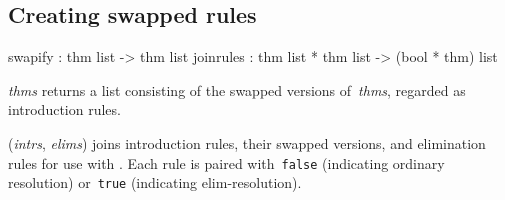 \subsection{Creating swapped rules}
\begin{ttbox} 
swapify   : thm list -> thm list
joinrules : thm list * thm list -> (bool * thm) list
\end{ttbox}
\begin{ttdescription}
\item[\ttindexbold{swapify} {\it thms}] returns a list consisting of the
swapped versions of~{\it thms}, regarded as introduction rules.

\item[\ttindexbold{joinrules} ({\it intrs}, {\it elims})]
joins introduction rules, their swapped versions, and elimination rules for
use with .  Each rule is paired with~\texttt{false}
(indicating ordinary resolution) or~\texttt{true} (indicating
elim-resolution).
\end{ttdescription}


